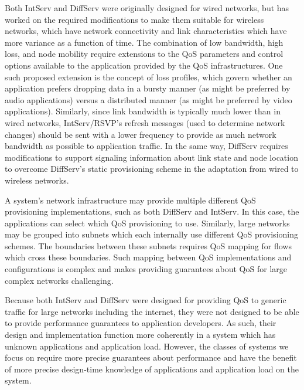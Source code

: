 Both IntServ and DiffServ were originally designed for wired networks,
but \cite{diffServ_intServ_Mahadevan1999} has worked on the required
modifications to make them suitable for wireless networks, which have
network connectivity and link characteristics which have more variance
as a function of time.  The combination of low bandwidth, high loss,
and node mobility require extensions to the QoS parameters and control
options available to the application provided by the QoS
infrastructures.  One such proposed extension is the concept of loss
profiles, which govern whether an application prefers dropping data in
a bursty manner (as might be preferred by audio applications) versus a
distributed manner (as might be preferred by video applications).
Similarly, since link bandwidth is typically much lower than in wired
networks, IntServ/RSVP's refresh messages (used to determine network
changes) should be sent with a lower frequency to provide as much
network bandwidth as possible to application traffic.  In the same
way, DiffServ requires modifications to support signaling information
about link state and node location to overcome DiffServ's static
provisioning scheme in the adaptation from wired to wireless networks.

A system's network infrastructure may provide multiple different QoS
provisioning implementations, such as both DiffServ and IntServ.  In
this case, the applications can select which QoS provisioning to use.
Similarly, large networks may be grouped into subnets which each
internally use different QoS provisioning schemes.  The boundaries
between these subnets requires QoS mapping for flows which cross these
boundaries.  Such mapping between QoS implementations and
configurations is complex and makes providing guarantees about QoS for
large complex networks challenging.

Because both IntServ and DiffServ were designed for providing QoS to
generic traffic for large networks including the internet, they were
not designed to be able to provide performance guarantees to
application developers.  As such, their design and implementation
function more coherently in a system which has unknown applications
and application load.  However, the classes of systems we focus on
require more precise guarantees about performance and have the benefit
of more precise design-time knowledge of applications and application
load on the system.

